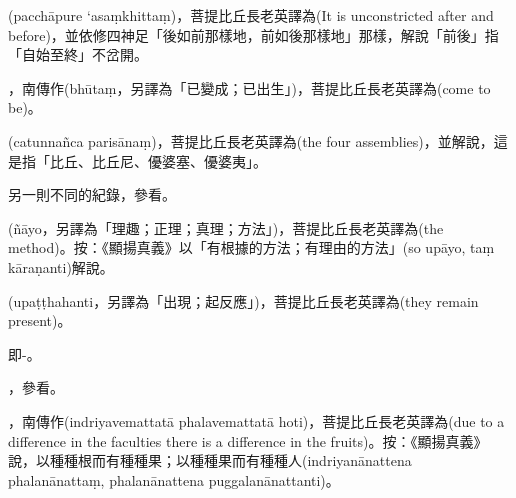 \startitemgroup[noteitems]
\item{}(pacchāpure ‘asaṃkhittaṃ)，菩提比丘長老英譯為(It is unconstricted after and before)，並依修四神足「後如前那樣地，前如後那樣地」那樣，解說「前後」指「自始至終」不岔開。
\stopitemgroup

\startitemgroup[noteitems]
\item{}，南傳作(bhūtaṃ，另譯為「已變成；已出生」)，菩提比丘長老英譯為(come to be)。
\stopitemgroup

\startitemgroup[noteitems]
\item{}(catunnañca parisānaṃ)，菩提比丘長老英譯為(the four assemblies)，並解說，這是指「比丘、比丘尼、優婆塞、優婆夷」。
\stopitemgroup

\startitemgroup[noteitems]
\item{}另一則不同的紀錄，參看。
\stopitemgroup

\startitemgroup[noteitems]
\item{}(ñāyo，另譯為「理趣；正理；真理；方法」)，菩提比丘長老英譯為(the method)。按：《顯揚真義》以「有根據的方法；有理由的方法」(so upāyo, taṃ kāraṇanti)解說。
\stopitemgroup

\startitemgroup[noteitems]
\item{}(upaṭṭhahanti，另譯為「出現；起反應」)，菩提比丘長老英譯為(they remain present)。
\stopitemgroup

\startitemgroup[noteitems]
\item{}即-。
\stopitemgroup

\startitemgroup[noteitems]
\item{}，參看。
\stopitemgroup

\startitemgroup[noteitems]
\item{}，南傳作(indriyavemattatā phalavemattatā hoti)，菩提比丘長老英譯為(due to a difference in the faculties there is a difference in the fruits)。按：《顯揚真義》說，以種種根而有種種果；以種種果而有種種人(indriyanānattena phalanānattaṃ, phalanānattena puggalanānattanti)。
\stopitemgroup

